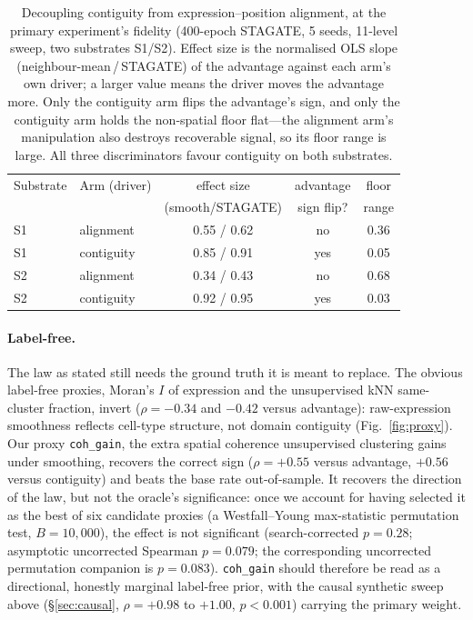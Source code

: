 \documentclass[journal]{IEEEtran}
\begin{document}
\begin{table}[tbp]\centering\small\setlength{\tabcolsep}{4pt}
\caption{Decoupling contiguity from expression--position alignment, at the primary experiment's fidelity
(400-epoch STAGATE, 5 seeds, 11-level sweep, two substrates S1/S2). Effect size is the normalised OLS
slope (neighbour-mean\,/\,STAGATE) of the advantage against each arm's own driver; a larger value means
the driver moves the advantage more. Only the contiguity arm flips the advantage's sign, and only the
contiguity arm holds the non-spatial floor flat---the alignment arm's manipulation also destroys
recoverable signal, so its floor range is large. All three discriminators favour contiguity on both
substrates.}
\label{tab:decouple}
\begin{tabular}{llccc}
\toprule
Substrate & Arm (driver) & effect size & advantage & floor\\
          &              & (smooth/STAGATE) & sign flip? & range\\
\midrule
S1 & alignment  & 0.55 / 0.62 & no  & 0.36\\
S1 & contiguity & 0.85 / 0.91 & yes & 0.05\\
S2 & alignment  & 0.34 / 0.43 & no  & 0.68\\
S2 & contiguity & 0.92 / 0.95 & yes & 0.03\\
\bottomrule
\end{tabular}
\end{table}

\paragraph{Label-free.} The law as stated still needs the ground truth it is meant to replace. The obvious
label-free proxies, Moran's $I$ of expression and the unsupervised kNN same-cluster fraction, invert
($\rho=-0.34$ and $-0.42$ versus advantage): raw-expression smoothness reflects cell-type structure, not
domain contiguity (Fig.~\ref{fig:proxy}). Our proxy \texttt{coh\_gain}, the extra spatial coherence
unsupervised clustering gains under smoothing, recovers the correct sign ($\rho=+0.55$ versus advantage,
$+0.56$ versus contiguity) and beats the base rate out-of-sample. It recovers the direction of the law, but
not the oracle's significance: once we account for having selected it as the best of six candidate proxies
(a Westfall--Young max-statistic permutation test, $B{=}10{,}000$), the effect is not significant
(search-corrected $p=0.28$; asymptotic uncorrected Spearman $p=0.079$; the corresponding
uncorrected permutation companion is $p=0.083$). \texttt{coh\_gain} should therefore be read
as a directional, honestly marginal label-free prior, with the causal synthetic sweep above
(\S\ref{sec:causal}, $\rho=+0.98$ to $+1.00$, $p<0.001$) carrying the primary weight.
\end{document}
